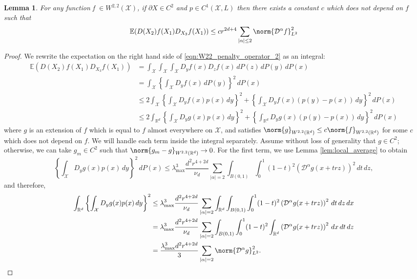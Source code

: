 \documentclass{article}
\newcommand{\Reals}{\mathbb{R}}
\newcommand{\abs}[1]{\left \lvert #1 \right \rvert}
\newcommand{\1}{\mathbf{1}}
\newcommand{\Rd}{\Reals^d}
\newcommand{\domain}{\mathcal{X}}
\newcommand{\Ebb}{\mathbb{E}}
\newcommand{\Partial}{\mathcal{D}}
\theoremstyle{alden}
\theoremstyle{aldenthm}
\newtheorem{lemma}{Lemma}
\theoremstyle{definition}
\theoremstyle{remark}
\begin{document}
\begin{lemma}
	\label{lem:W22_penalty_operator_2}
	For any function f $\in W^{2,2}(\mathcal{X})$, if $\partial X \in C^2$ and $p \in C^1(\domain,L)$ then there exists a constant $c$ which does not depend on $f$ such that
	\begin{equation}
	\label{eqn:W22_penalty_operator_2}
	\Ebb(D(X_2)f(X_1)D_{X_3}f(X_1)) \leq c r^{2d + 4} \sum_{\abs{\alpha} \leq 2} \norm{\Partial^{\alpha}f}_{L^2}^2
	\end{equation}
\end{lemma}
\begin{proof}
	We rewrite the expectation on the right hand side of \eqref{eqn:W22_penalty_operator_2} as an integral:
	\begin{align*}
	\Ebb(D(X_2)f(X_1)D_{X_3}f(X_1)) & = \int_{\domain} \int_{\domain} \int_{\domain} D_yf(x) D_zf(x) \,dP(z) \,dP(y) \,dP(x) \\
	& = \int_{\domain} \left\{\int_{\domain} D_yf(x) \,dP(y)\right\}^2 \,dP(x) \\
	& \leq 2 \int_{\domain} \left\{\int_{\domain} D_yf(x) p(x) \,dy \right\}^2 +  \left\{\int_{\domain} D_yf(x) (p(y) - p(x)) \,dy \right\}^2 \,dP(x) \\
	& \leq 2 \int_{\Rd} \left\{\int_{\domain} D_yg(x) p(x) \,dy \right\}^2 +  \left\{\int_{\Rd} D_yg(x) (p(y) - p(x)) \,dy \right\}^2 \,dP(x)
	\end{align*}
	where $g$ is an extension of $f$ which is equal to $f$ almost everywhere on $\domain$, and satisfies $\norm{g}_{W^{2,2}(\Rd)} \leq c \norm{f}_{W^{2,2}(\Rd)}$ for some $c$ which does not depend on $f$. We will handle each term inside the integral separately. Assume without loss of generality that $g \in C^2$; otherwise, we can take $g_m \in C^2$ such that $\norm{g_m - g}_{W^{2,2}(\Rd)} \to 0$. For the first term, we use Lemma \ref{lem:local_average} to obtain
	\begin{equation*}
	\left\{\int_{\domain} D_yg(x) p(x) \,dy \right\}^2 \,dP(x) \leq \lambda_{\max}^3 \frac{d^2 r^{4 + 2d}}{\nu_d} \sum_{\abs{\alpha} = 2}\int_{B(0,1)} \int_{0}^{1} (1 - t)^2 \left(\Partial^{\alpha}g(x + trz)\right)^2 \,dt  \,dz,
	\end{equation*}
	and therefore,
	\begin{align*}
	\int_{\Rd} \left\{\int_{\domain} D_yg(x) p(x) \,dy \right\}^2 & \leq \lambda_{\max}^3 \frac{d^2 r^{4 + 2d}}{\nu_d} \sum_{\abs{\alpha} = 2}\int_{\Rd} \int_{B(0,1)} \int_{0}^{1} (1 - t)^2 \left(\Partial^{\alpha}g(x + trz)\right)^2 \,dt  \,dz \,dx \\
	& = \lambda_{\max}^3 \frac{d^2 r^{4 + 2d}}{\nu_d} \sum_{\abs{\alpha} = 2} \int_{B(0,1)}  \int_{0}^{1} (1 - t)^2 \int_{\Rd} \left(\Partial^{\alpha}g(x + trz)\right)^2 \,dx \,dt \,dz \\
	& = \frac{\lambda_{\max}^3 d^2 r^{4 + 2d}}{3} \sum_{\abs{\alpha} = 2} \norm{\Partial^{\alpha}g}_{L^2}^2.
	\end{align*}
	

\end{proof}
\end{document}
